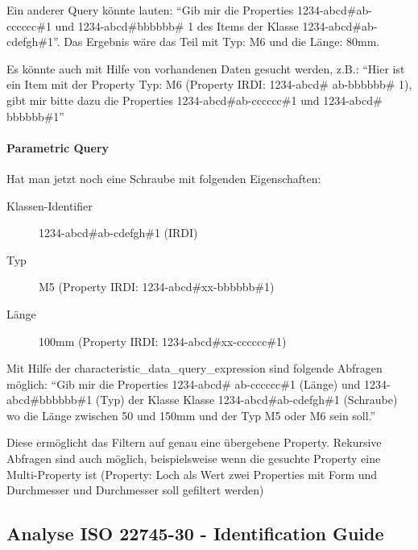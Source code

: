 Ein anderer Query könnte lauten:  \enquote{Gib mir die Properties 1234-abcd\#ab-cccccc\#1 und 1234-abcd\#bbbbbb\# 1 des Items der Klasse 1234-abcd\#ab-cdefgh\#1}. Das Ergebnis wäre das Teil mit Typ: M6 und die Länge: 80mm.

Es könnte auch mit Hilfe von vorhandenen Daten gesucht werden, z.B.:  \enquote{Hier ist ein Item mit der Property Typ: M6 (Property IRDI: 1234-abcd\# ab-bbbbbb\# 1), gibt mir bitte dazu die Properties 1234-abcd\#ab-cccccc\#1 und 1234-abcd\# bbbbbb\#1} 

\paragraph{Parametric Query}

Hat man jetzt noch eine Schraube mit folgenden Eigenschaften:
\begin{description}
\item[Klassen-Identifier] 1234-abcd\#ab-cdefgh\#1 (IRDI)
\item[Typ] M5 (Property IRDI: 1234-abcd\#xx-bbbbbb\#1)
\item[Länge] 100mm (Property IRDI: 1234-abcd\#xx-cccccc\#1)
\end{description}


Mit Hilfe der characteristic\_data\_query\_expression sind folgende Abfragen möglich:  \enquote{Gib mir die Properties 1234-abcd\# ab-cccccc\#1 (Länge) und 1234-abcd\#bbbbbb\#1 (Typ) der Klasse Klasse 1234-abcd\#ab-cdefgh\#1 (Schraube) wo die Länge zwischen 50 und 150mm und der Typ M5 oder M6 sein soll.}

Diese ermöglicht das Filtern auf genau eine übergebene Property. Rekursive Abfragen sind auch möglich, beispielsweise wenn die gesuchte Property eine Multi-Property ist (Property: Loch als Wert zwei Properties mit Form und Durchmesser und Durchmesser soll gefiltert werden)

\subsection{Analyse ISO 22745-30 - Identification Guide}\label{kap:identification_guide}

